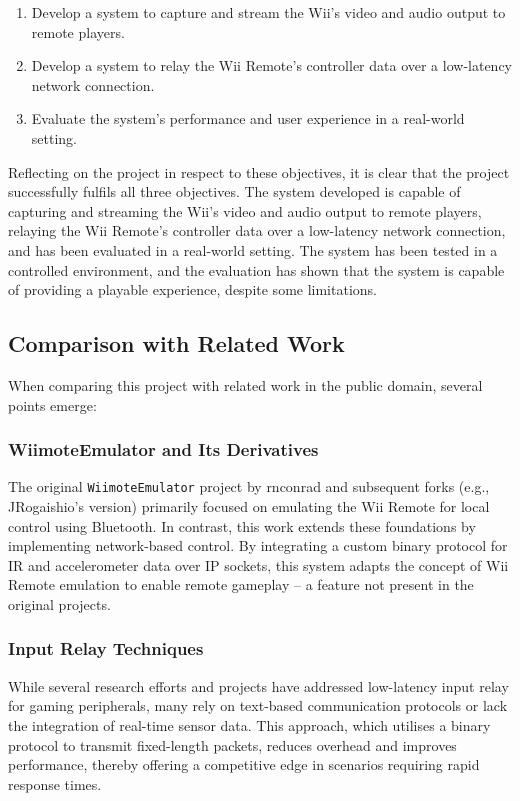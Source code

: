\begin{enumerate}
\item  Develop a system to capture and stream the Wii’s video and audio output to remote players.
\item Develop a system to relay the Wii Remote’s controller data over a low-latency network connection.
\item Evaluate the system’s performance and user experience in a real-world setting.
\end{enumerate}

Reflecting on the project in respect to these objectives, it is clear that the project successfully fulfils all three objectives. The system developed is capable of capturing and streaming the Wii’s video and audio output to remote players, relaying the Wii Remote’s controller data over a low-latency network connection, and has been evaluated in a real-world setting. The system has been tested in a controlled environment, and the evaluation has shown that the system is capable of providing a playable experience, despite some limitations.

\subsection*{Comparison with Related Work}
When comparing this project with related work in the public domain, several points emerge:

\subsubsection{WiimoteEmulator and Its Derivatives}
The original \texttt{WiimoteEmulator} project by rnconrad and subsequent forks (e.g., JRogaishio's version) primarily focused on emulating the Wii Remote for local control using Bluetooth. In contrast, this work extends these foundations by implementing network-based control. By integrating a custom binary protocol for IR and accelerometer data over IP sockets, this system adapts the concept of Wii Remote emulation to enable remote gameplay -- a feature not present in the original projects.

\subsubsection{Input Relay Techniques}
While several research efforts and projects have addressed low-latency input relay for gaming peripherals, many rely on text-based communication protocols or lack the integration of real-time sensor data. This approach, which utilises a binary protocol to transmit fixed-length packets, reduces overhead and improves performance, thereby offering a competitive edge in scenarios requiring rapid response times.

